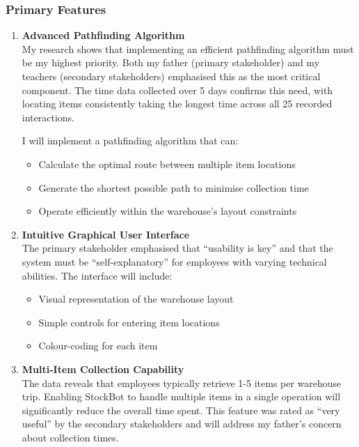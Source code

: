 \subsubsection{Primary Features}

\begin{enumerate}
    \item \textbf{Advanced Pathfinding Algorithm}\\
    My research shows that implementing an efficient pathfinding algorithm must be my highest priority. Both my father (primary stakeholder) and my teachers (secondary stakeholders) emphasised this as the most critical component. The time data collected over 5 days confirms this need, with locating items consistently taking the longest time across all 25 recorded interactions.
    
    I will implement a pathfinding algorithm that can:
    \begin{itemize}
        \item Calculate the optimal route between multiple item locations
        \item Generate the shortest possible path to minimise collection time
        \item Operate efficiently within the warehouse's layout constraints
    \end{itemize}
    
    \item \textbf{Intuitive Graphical User Interface}\\
    The primary stakeholder emphasised that ``usability is key'' and that the system must be ``self-explanatory'' for employees with varying technical abilities. The interface will include:
    \begin{itemize}
        \item Visual representation of the warehouse layout
        \item Simple controls for entering item locations
        \item Colour-coding for each item
    \end{itemize}
    
    \item \textbf{Multi-Item Collection Capability}\\
    The data reveals that employees typically retrieve 1-5 items per warehouse trip. Enabling StockBot to handle multiple items in a single operation will significantly reduce the overall time spent. This feature was rated as ``very useful'' by the secondary stakeholders and will address my father's concern about collection times.
\end{enumerate}

